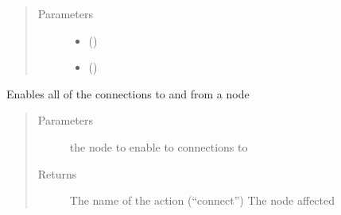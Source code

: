 \documentclass[letterpaper,10pt,english]{sphinxmanual}
\begin{document}
\begin{fulllineitems}
\begin{fulllineitems}
\begin{itemize}
\end{itemize}
\begin{quote}\begin{description}
\item[{Parameters}] \leavevmode\begin{itemize}
\item {}
\sphinxAtStartPar
{} () \textendash{}

\item {}
\sphinxAtStartPar
{} () \textendash{}

\end{itemize}

\end{description}\end{quote}

\end{fulllineitems}


\begin{fulllineitems}
\label{\detokenize{source/yawning_titan.envs.generic.core:yawning_titan.envs.generic.core.blue_action_set.BlueActionSet.reconnect_node}}
\sphinxAtStartPar
Enables all of the connections to and from a node
\begin{quote}\begin{description}
\item[{Parameters}] \leavevmode
\sphinxAtStartPar
{} \textendash{} the node to enable to connections to

\item[{Returns}] \leavevmode
\sphinxAtStartPar
The name of the action (“connect”)
The node affected

\end{description}\end{quote}

\end{fulllineitems}


\end{fulllineitems}
\end{document}
